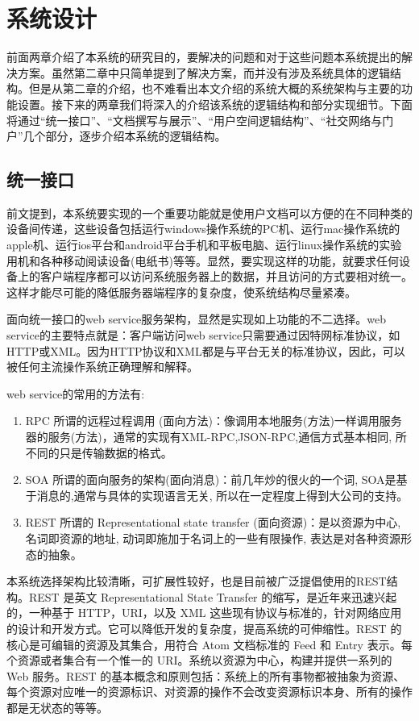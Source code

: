 
\chapter{系统设计}
\label{chap:design}

前面两章介绍了本系统的研究目的，要解决的问题和对于这些问题本系统提出的解决方案。虽然第二章中只简单提到了解决方案，而并没有涉及系统具体的逻辑结构。但是从第二章的介绍，也不难看出本文介绍的系统大概的系统架构与主要的功能设置。接下来的两章我们将深入的介绍该系统的逻辑结构和部分实现细节。下面将通过“统一接口”、“文档撰写与展示”、“用户空间逻辑结构”、“社交网络与门户”几个部分，逐步介绍本系统的逻辑结构。

\section{统一接口}
\label{sec:restful}

前文提到，本系统要实现的一个重要功能就是使用户文档可以方便的在不同种类的设备间传递，这些设备包括运行windows操作系统的PC机、运行mac操作系统的apple机、运行ios平台和android平台手机和平板电脑、运行linux操作系统的实验用机和各种移动阅读设备(电纸书)等等。显然，要实现这样的功能，就要求任何设备上的客户端程序都可以访问系统服务器上的数据，并且访问的方式要相对统一。这样才能尽可能的降低服务器端程序的复杂度，使系统结构尽量紧凑。

面向统一接口的web service服务架构，显然是实现如上功能的不二选择。web service的主要特点就是：客户端访问web service只需要通过因特网标准协议，如HTTP或XML。因为HTTP协议和XML都是与平台无关的标准协议，因此，可以被任何主流操作系统正确理解和解释。

web service的常用的方法有:
\begin{enumerate}
\item RPC 所谓的远程过程调用 (面向方法)：像调用本地服务(方法)一样调用服务器的服务(方法)，通常的实现有XML-RPC,JSON-RPC,通信方式基本相同, 所不同的只是传输数据的格式。
\item SOA 所谓的面向服务的架构(面向消息)：前几年炒的很火的一个词, SOA是基于消息的,通常与具体的实现语言无关, 所以在一定程度上得到大公司的支持。
\item REST 所谓的 Representational state transfer (面向资源)：是以资源为中心, 名词即资源的地址, 动词即施加于名词上的一些有限操作, 表达是对各种资源形态的抽象。
\end{enumerate}
本系统选择架构比较清晰，可扩展性较好，也是目前被广泛提倡使用的REST结构。REST 是英文 Representational State Transfer 的缩写，是近年来迅速兴起的，一种基于 HTTP，URI，以及 XML 这些现有协议与标准的，针对网络应用的设计和开发方式。它可以降低开发的复杂度，提高系统的可伸缩性。REST 的核心是可编辑的资源及其集合，用符合 Atom 文档标准的 Feed 和 Entry 表示。每个资源或者集合有一个惟一的 URI。系统以资源为中心，构建并提供一系列的 Web 服务。REST 的基本概念和原则包括：系统上的所有事物都被抽象为资源、每个资源对应唯一的资源标识、对资源的操作不会改变资源标识本身、所有的操作都是无状态的等等。

